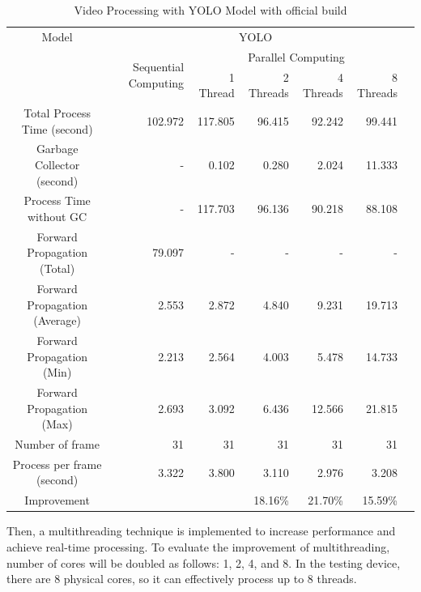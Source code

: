             \begin{table}[!htp]\centering
                \scriptsize
                \begin{tabular}{lrrrrrrr}\toprule
                    \multicolumn{2}{c}{Model} &\multicolumn{5}{c}{YOLO} \\\cmidrule{1-7}
                    \multicolumn{2}{c}{\multirow{2}{*}{}} &\multirow{2}{*}{Sequential Computing} &\multicolumn{4}{c}{Parallel Computing} \\\cmidrule{4-7}
                    & & &1 Thread &2 Threads &4 Threads &8 Threads \\\midrule
                    \multicolumn{2}{c}{Total Process Time (second)} &102.972 &117.805 &96.415 &92.242 &99.441 \\
                    \multicolumn{2}{c}{Garbage Collector (second)} &- &0.102 &0.280 &2.024 &11.333 \\
                    \multicolumn{2}{c}{Process Time without GC} &- &117.703 &96.136 &90.218 &88.108 \\
                    \multicolumn{2}{c}{Forward Propagation (Total)} &79.097 &- &- &- &- \\
                    \multicolumn{2}{c}{Forward Propagation (Average)} &2.553 &2.872 &4.840 &9.231 &19.713 \\
                    \multicolumn{2}{c}{Forward Propagation (Min)} &2.213 &2.564 &4.003 &5.478 &14.733 \\
                    \multicolumn{2}{c}{Forward Propagation (Max)} &2.693 &3.092 &6.436 &12.566 &21.815 \\
                    \multicolumn{2}{c}{Number of frame} &31 &31 &31 &31 &31 \\
                    \multicolumn{2}{c}{Process per frame (second)} &3.322 &3.800 &3.110 &2.976 &3.208 \\
                    \multicolumn{2}{c}{Improvement} & & &18.16\% &21.70\% &15.59\% \\
                    \bottomrule
                \end{tabular}

                \caption{Video Processing with YOLO Model with official build}\label{yolo:official-performace}
            \end{table}

            Then, a multithreading technique is implemented to increase performance and achieve real-time processing.
            To evaluate the improvement of multithreading, number of cores will be doubled as follows: 1, 2, 4, and 8.
            In the testing device, there are 8 physical cores, so it can effectively process up to 8 threads.


